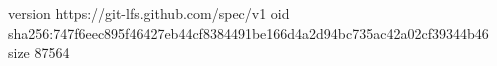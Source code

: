version https://git-lfs.github.com/spec/v1
oid sha256:747f6eec895f46427eb44cf8384491be166d4a2d94bc735ac42a02cf39344b46
size 87564
